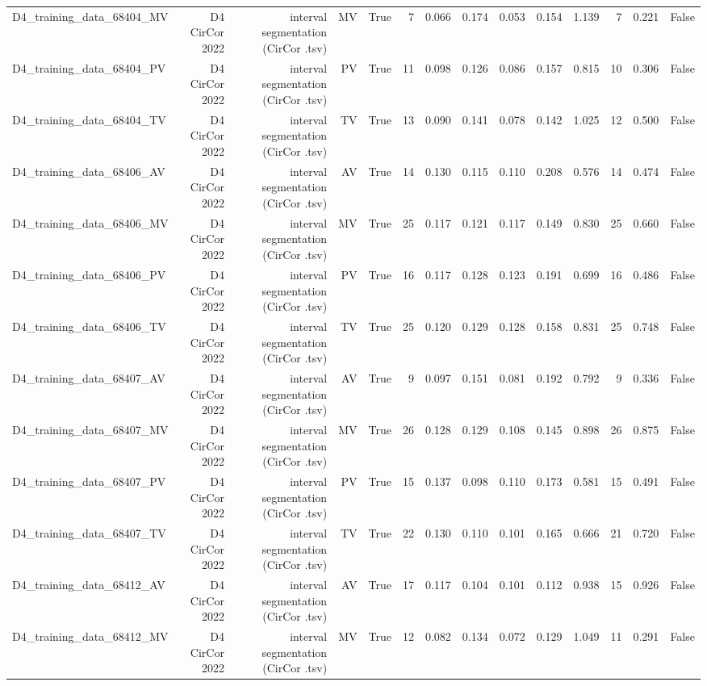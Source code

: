 \begin{table}[htbp]
\begin{tabular}{lrrrrrrrrrrrrr}
    D4\_training\_data\_68404\_MV & D4 CirCor 2022 & interval segmentation (CirCor .tsv) & MV & True & 7 & 0.066 & 0.174 & 0.053 & 0.154 & 1.139 & 7 & 0.221 & False \\
    D4\_training\_data\_68404\_PV & D4 CirCor 2022 & interval segmentation (CirCor .tsv) & PV & True & 11 & 0.098 & 0.126 & 0.086 & 0.157 & 0.815 & 10 & 0.306 & False \\
    D4\_training\_data\_68404\_TV & D4 CirCor 2022 & interval segmentation (CirCor .tsv) & TV & True & 13 & 0.090 & 0.141 & 0.078 & 0.142 & 1.025 & 12 & 0.500 & False \\
    D4\_training\_data\_68406\_AV & D4 CirCor 2022 & interval segmentation (CirCor .tsv) & AV & True & 14 & 0.130 & 0.115 & 0.110 & 0.208 & 0.576 & 14 & 0.474 & False \\
    D4\_training\_data\_68406\_MV & D4 CirCor 2022 & interval segmentation (CirCor .tsv) & MV & True & 25 & 0.117 & 0.121 & 0.117 & 0.149 & 0.830 & 25 & 0.660 & False \\
    D4\_training\_data\_68406\_PV & D4 CirCor 2022 & interval segmentation (CirCor .tsv) & PV & True & 16 & 0.117 & 0.128 & 0.123 & 0.191 & 0.699 & 16 & 0.486 & False \\
    D4\_training\_data\_68406\_TV & D4 CirCor 2022 & interval segmentation (CirCor .tsv) & TV & True & 25 & 0.120 & 0.129 & 0.128 & 0.158 & 0.831 & 25 & 0.748 & False \\
    D4\_training\_data\_68407\_AV & D4 CirCor 2022 & interval segmentation (CirCor .tsv) & AV & True & 9 & 0.097 & 0.151 & 0.081 & 0.192 & 0.792 & 9 & 0.336 & False \\
    D4\_training\_data\_68407\_MV & D4 CirCor 2022 & interval segmentation (CirCor .tsv) & MV & True & 26 & 0.128 & 0.129 & 0.108 & 0.145 & 0.898 & 26 & 0.875 & False \\
    D4\_training\_data\_68407\_PV & D4 CirCor 2022 & interval segmentation (CirCor .tsv) & PV & True & 15 & 0.137 & 0.098 & 0.110 & 0.173 & 0.581 & 15 & 0.491 & False \\
    D4\_training\_data\_68407\_TV & D4 CirCor 2022 & interval segmentation (CirCor .tsv) & TV & True & 22 & 0.130 & 0.110 & 0.101 & 0.165 & 0.666 & 21 & 0.720 & False \\
    D4\_training\_data\_68412\_AV & D4 CirCor 2022 & interval segmentation (CirCor .tsv) & AV & True & 17 & 0.117 & 0.104 & 0.101 & 0.112 & 0.938 & 15 & 0.926 & False \\
    D4\_training\_data\_68412\_MV & D4 CirCor 2022 & interval segmentation (CirCor .tsv) & MV & True & 12 & 0.082 & 0.134 & 0.072 & 0.129 & 1.049 & 11 & 0.291 & False \\

\end{tabular}
\end{table}
